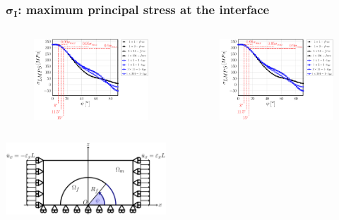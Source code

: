 \documentclass[first,firstsupp,lastsupp,last,hyperref,table]{ETHclass}
\begin{document}
\addtocounter{framenumber}{-1}

\begin{frame}
\frametitle{\vspace{0.2cm}\small $\mathbf{\sigma_{I}}$: maximum principal stress at the interface}
\vspace{-.75cm}
\centering
\begin{columns}[c]
\centering
\begin{column}{0.5\textwidth}
\centering
\begin{figure}
\centering
\includegraphics[width=\columnwidth]{vf60-nodamage-sigmaI2D.pdf}
\end{figure}
\end{column}
\begin{column}{0.5\textwidth}
\centering
\begin{figure}
\centering
\includegraphics[width=\columnwidth]{vf60-nodamage-sigmaI3D.pdf}
\end{figure}
\end{column}
\end{columns}
\vspace{-0.3cm}
\includegraphics[width=0.45\textwidth]{refAngle.pdf}
\end{frame}
\end{document}
